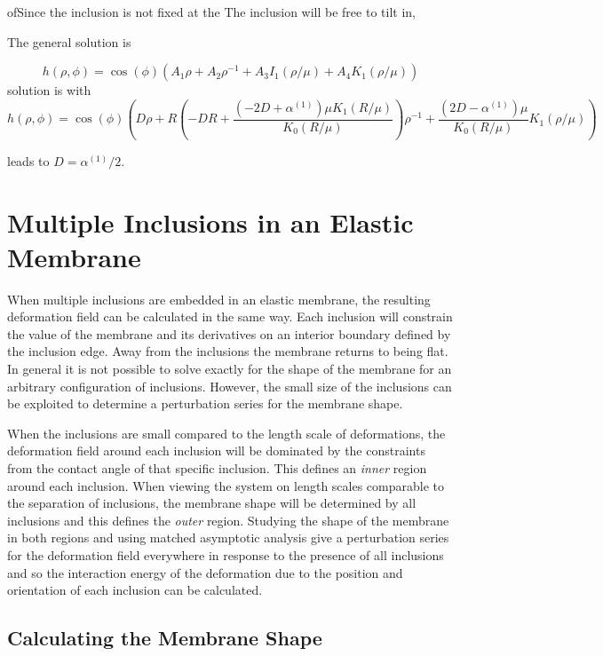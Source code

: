 { ofSince the inclusion is not fixed at the The inclusion will be free to tilt in, 

The general solution is

\begin{equation}
    h(\rho, \phi) = \cos(\phi)\left(A_{1}\rho + A_{2}\rho^{-1} + A_{3}I_{1}(\rho/\mu)+A_{4}K_{1}(\rho/\mu)\right)
\end{equation}
solution is with
\begin{equation}
    h(\rho, \phi) = \cos(\phi)\left(D\rho + R\left(-D R + \frac{(-2D + \alpha^{(1)})\mu K_{1}(R/\mu)}{K_{0}(R/\mu)}\right)\rho^{-1} + \frac{(2D-\alpha^{(1)})\mu}{K_{0}(R/\mu)} K_{1}(\rho/\mu)\right)
\end{equation}

leads to $D = \alpha^{(1)}/2$.}

\section{Multiple Inclusions in an Elastic Membrane}

When multiple inclusions are embedded in an elastic membrane, the resulting deformation field can be calculated in the same way. Each inclusion will constrain the value of the membrane and its derivatives on an interior boundary defined by the inclusion edge. Away from the inclusions the membrane returns to being flat. In general it is not possible to solve exactly for the shape of the membrane for an arbitrary configuration of inclusions. However, the small size of the inclusions can be exploited to determine a perturbation series for the membrane shape.

When the inclusions are small compared to the length scale of deformations, the deformation field around each inclusion will be dominated by the constraints from the contact angle of that specific inclusion. This defines an \textit{inner} region around each inclusion. When viewing the system on length scales comparable to the separation of inclusions, the membrane shape will be determined by all inclusions and this defines the \textit{outer} region. Studying the shape of the membrane in both regions and using matched asymptotic analysis give a perturbation series for the deformation field everywhere in response to the presence of all inclusions and so the interaction energy of the deformation due to the position and orientation of each inclusion can be calculated.

\subsection{Calculating the Membrane Shape}

